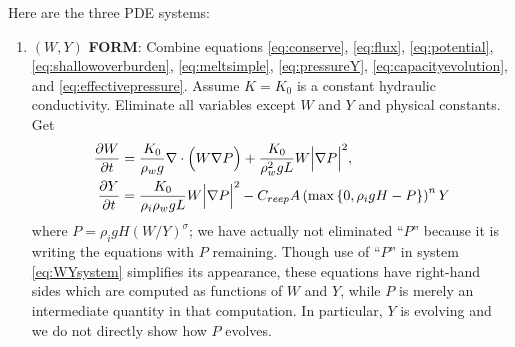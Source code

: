 \documentclass[11pt]{amsart}
\newcommand{\Creep}{C_{reep}}
\begin{document}
Here are the three PDE systems:
\renewcommand{\labelenumi}{\textbf{\Roman{enumi}.}}
\begin{enumerate}
\item $(W,Y)$ \textbf{FORM}:  Combine equations \eqref{eq:conserve}, \eqref{eq:flux}, \eqref{eq:potential}, \eqref{eq:shallowoverburden}, \eqref{eq:meltsimple}, \eqref{eq:pressureY},  \eqref{eq:capacityevolution}, and \eqref{eq:effectivepressure}.  Assume $K=K_0$ is a constant hydraulic conductivity.  Eliminate all variables except $W$ and $Y$ and physical constants.  Get
\begin{align}
\frac{\partial W}{\partial t} &= \frac{K_0}{\rho_w g} \nabla \cdot \Big(W \nabla P\Big) + \frac{K_0}{\rho_w^2 g L} W \Big|\nabla P\Big|^2, \label{eq:WYsystem} \\
\frac{\partial Y}{\partial t} &= \frac{K_0}{\rho_i \rho_w g L} W \Big|\nabla P\Big|^2 \notag - \Creep A \left(\max\left\{0,\rho_i g H - P\right\}\right)^n Y  \notag
\end{align}
where $P = \rho_i g H \left(W/Y\right)^\sigma$; we have actually not eliminated ``$P$'' because it is writing the equations with $P$ remaining.  Though use of ``$P$'' in system \eqref{eq:WYsystem} simplifies its appearance, these equations have right-hand sides which are computed as functions of $W$ and $Y$, while $P$ is merely an intermediate quantity in that computation.  In particular, $Y$ is evolving and we do not directly show how $P$ evolves.


\end{enumerate}
\end{document}
